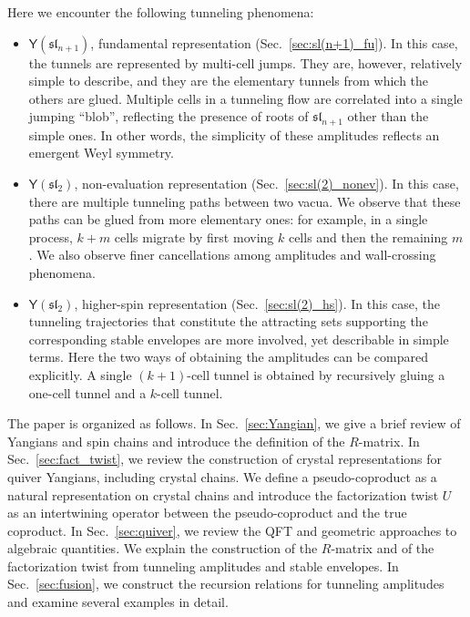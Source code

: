 \documentclass[10pt]{article}
\theoremstyle{definition}
\def\fl{\mathfrak{l}}
\def\fs{\mathfrak{s}}
\def\fs{\mathfrak{s}}
\def\myY{{\mathsf{Y}}}
\numberwithin{equation}{section}
\begin{document}
Here we encounter the following tunneling phenomena:
\begin{itemize}
	\item $\myY(\fs\fl_{n+1})$, fundamental representation (Sec.~\ref{sec:sl(n+1)_fu}).
	In this case, the tunnels are represented by multi-cell jumps.
	They are, however, relatively simple to describe, and they are the elementary tunnels from which the others are glued.
	Multiple cells in a tunneling flow are correlated into a single jumping ``blob'', reflecting the presence of roots of $\fs\fl_{n+1}$ other than the simple ones.
	In other words, the simplicity of these amplitudes reflects an emergent Weyl symmetry.
	\item $\myY(\fs\fl_{2})$, non-evaluation representation (Sec.~\ref{sec:sl(2)_nonev}).
	In this case, there are multiple tunneling paths between two vacua.
	We observe that these paths can be glued from more elementary ones: for example, in a single process, $k+m$ cells migrate by first moving $k$ cells and then the remaining $m$.
	We also observe finer cancellations among amplitudes and wall-crossing phenomena.
	\item $\myY(\fs\fl_{2})$, higher-spin representation (Sec.~\ref{sec:sl(2)_hs}).
	In this case, the tunneling trajectories that constitute the attracting sets supporting the corresponding stable envelopes are more involved, yet describable in simple terms.
	Here the two ways of obtaining the amplitudes can be compared explicitly.
	A single $(k+1)$-cell tunnel is obtained by recursively gluing a one-cell tunnel and a $k$-cell tunnel.
\end{itemize}

The paper is organized as follows.
In Sec.~\ref{sec:Yangian}, we give a brief review of Yangians and spin chains and introduce the definition of the $R$-matrix.
In Sec.~\ref{sec:fact_twist}, we review the construction of crystal representations for quiver Yangians, including crystal chains.
We define a pseudo-coproduct as a natural representation on crystal chains and introduce the factorization twist $U$ as an intertwining operator between the pseudo-coproduct and the true coproduct.
In Sec.~\ref{sec:quiver}, we review the QFT and geometric approaches to algebraic quantities.
We explain the construction of the $R$-matrix and of the factorization twist from tunneling amplitudes and stable envelopes.
In Sec.~\ref{sec:fusion}, we construct the recursion relations for tunneling amplitudes and examine several examples in detail.

\end{document}
